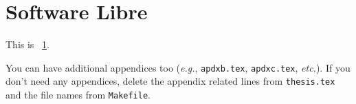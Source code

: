 {
  \linespread{1}
  \cleardoublepage  
  \appendix
  \chapter{Software Libre}
  \label{apdx:a}
}

This is \appendixname~\ref{apdx:a}.

You can have additional appendices too
(\emph{e.g.}, \texttt{apdxb.tex}, \texttt{apdxc.tex}, \emph{etc.}).
If you don't need any appendices, delete the appendix
related lines from \texttt{thesis.tex} and the file names
from \texttt{Makefile}.
